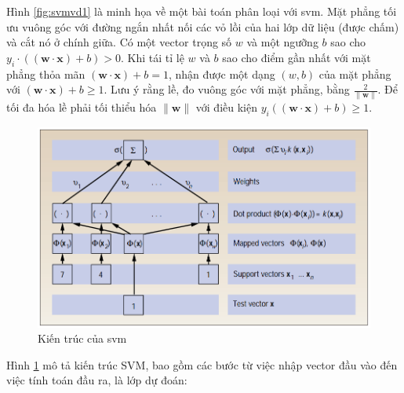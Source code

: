 \documentclass[a4paper]{article}
\begin{document}
Hình \ref{fig:svmvd1} là minh họa về một bài toán phân loại với svm. Mặt phẳng tối ưu vuông góc với đường ngắn nhất nối các vỏ lồi của hai lớp dữ liệu (được chấm) và cắt nó ở chính giữa. Có một vector trọng số \(w\) và một ngưỡng \(b\) sao cho \(y_i \cdot ((\mathbf{w} \cdot \mathbf{x}) + b) > 0\). Khi tái tỉ lệ \(w\) và \(b\) sao cho điểm gần nhất với mặt phẳng thỏa mãn \((\mathbf{w} \cdot \mathbf{x}) + b = 1\), nhận được một dạng \((w, b)\) của mặt phẳng với \((\mathbf{w} \cdot \mathbf{x}) + b \geq 1\). Lưu ý rằng lề, đo vuông góc với mặt phẳng, bằng \(\frac{2}{\|\mathbf{w}\|}\). Để tối đa hóa lề phải tối thiểu hóa \(\|\mathbf{w}\|\) với điều kiện \(y_i ((\mathbf{w} \cdot \mathbf{x}) + b) \geq 1\).

\begin{figure}
    \centering
    \includegraphics[width=0.6\linewidth]{images/svm-architecture.png}
    \caption{Kiến trúc của svm \cite{svm}}
    \label{fig:svm-architecture}
\end{figure}
Hình \ref{fig:svm-architecture} mô tả kiến trúc SVM, bao gồm các bước từ việc nhập vector đầu vào đến việc tính toán đầu ra, là lớp dự đoán:
\end{document}
